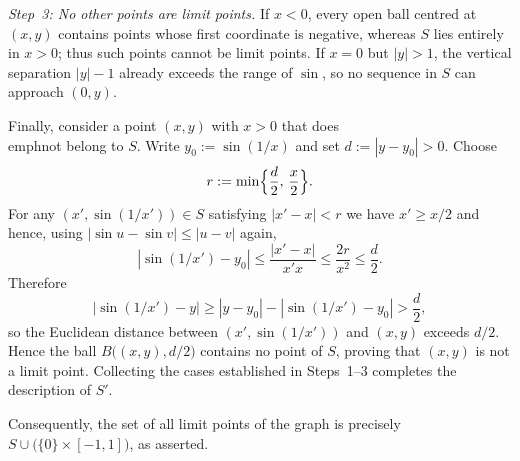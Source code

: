 \documentclass[10pt]{extarticle}
\begin{document}
\begin{solution}
    \medskip
    \emph{Step~3:  No other points are limit points.}  If $x<0$, every open ball centred at $(x,y)$ contains points whose first coordinate is negative, whereas $S$ lies entirely in $x>0$; thus such points cannot be limit points.  If $x=0$ but $|y|>1$, the vertical separation $|y|-1$ already exceeds the range of $\sin$, so no sequence in $S$ can approach $(0,y)$.

    Finally, consider a point $(x,y)$ with $x>0$ that does \\emph{not} belong to $S$.  Write $y_{0}:=\sin(1/x)$ and set $d:=|y-y_{0}|>0$.  Choose
    $$
        r:=\min\Bigl\{\frac{d}{2},\,\frac{x}{2}\Bigr\}.
    $$
    For any $(x',\sin(1/x'))\in S$ satisfying $|x'-x|<r$ we have $x'\ge x/2$ and hence, using $|\sin u-\sin v|\le|u-v|$ again,
    $$
        |\sin(1/x')-y_{0}|\le \frac{|x'-x|}{x' x}\le \frac{2r}{x^{2}}\le \frac{d}{2}.
    $$
    Therefore
    $$
        |\sin(1/x')-y|\ge |y-y_{0}|-|\sin(1/x')-y_{0}|>\frac{d}{2},
    $$
    so the Euclidean distance between $(x',\sin(1/x'))$ and $(x,y)$ exceeds $d/2$.  Hence the ball $B\bigl((x,y),d/2\bigr)$ contains no point of $S$, proving that $(x,y)$ is not a limit point.  Collecting the cases established in Steps~1--3 completes the description of $S'$.

    \medskip
    Consequently, the set of all limit points of the graph is precisely $S\cup\bigl(\{0\}\times[-1,1]\bigr)$, as asserted.
\end{solution}
\end{document}

